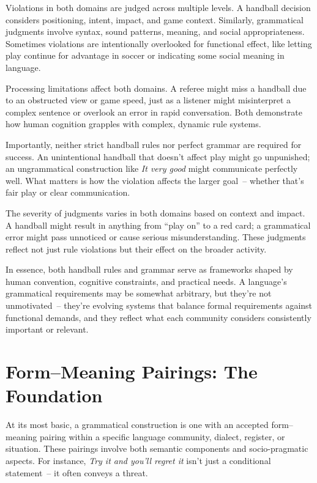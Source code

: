 Violations in both domains are judged across multiple levels. A handball decision considers positioning, intent, impact, and game context. Similarly, grammatical judgments involve syntax, sound patterns, meaning, and social appropriateness. Sometimes violations are intentionally overlooked for functional effect, like letting play continue for advantage in soccer or indicating some social meaning in language.

Processing limitations affect both domains. A referee might miss a handball due to an obstructed view or game speed, just as a listener might misinterpret a complex sentence or overlook an error in rapid conversation. Both demonstrate how human cognition grapples with complex, dynamic rule systems.

Importantly, neither strict handball rules nor perfect grammar are required for success. An unintentional handball that doesn't affect play might go unpunished; an ungrammatical construction like \textit{It very good} might communicate perfectly well. What matters is how the violation affects the larger goal~-- whether that's fair play or clear communication.

The severity of judgments varies in both domains based on context and impact. A handball might result in anything from ``play on'' to a red card; a grammatical error might pass unnoticed or cause serious misunderstanding. These judgments reflect not just rule violations but their effect on the broader activity.

In essence, both handball rules and grammar serve as frameworks shaped by human convention, cognitive constraints, and practical needs. A language's grammatical requirements may be somewhat arbitrary, but they're not unmotivated~-- they're evolving systems that balance formal requirements against functional demands, and they reflect what each community considers consistently important or relevant.

\section{Form--Meaning Pairings: The Foundation}

At its most basic, a grammatical construction is one with an accepted form--meaning pairing within a specific language community, dialect, register, or situation. These pairings involve both semantic components and socio-pragmatic aspects. For instance, \textit{Try it and you'll regret it} isn't just a conditional statement~-- it often conveys a threat.

